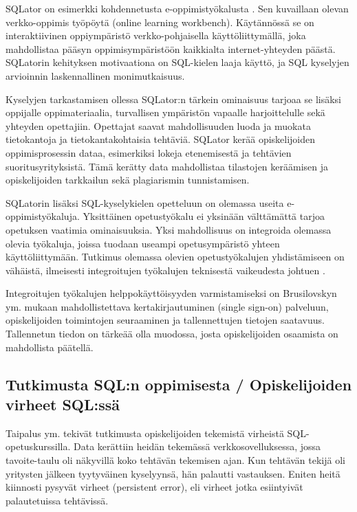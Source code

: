 \documentclass[finnish,twoside,openright]{HYgraduMLDS}
\begin{document}
SQLator on esimerkki kohdennetusta e-oppimistyökalusta \cite{sadiq2004sqlator}. Sen kuvaillaan olevan verkko-oppimis työpöytä (online learning workbench). Käytännössä se on interaktiivinen oppiympäristö verkko-pohjaisella käyttöliittymällä, joka mahdollistaa pääsyn oppimisympäristöön kaikkialta internet-yhteyden päästä. SQLatorin kehityksen motivaationa on SQL-kielen laaja käyttö, ja SQL kyselyjen arvioinnin laskennallinen monimutkaisuus. 

Kyselyjen tarkastamisen ollessa SQLator:n tärkein ominaisuus tarjoaa se lisäksi oppijalle oppimateriaalia, turvallisen ympäristön vapaalle harjoittelulle sekä yhteyden opettajiin. Opettajat saavat mahdollisuuden luoda ja muokata tietokantoja ja tietokantakohtaisia tehtäviä. SQLator kerää opiskelijoiden oppimisprosessin dataa, esimerkiksi lokeja etenemisestä ja tehtävien suoritusyrityksistä. Tämä kerätty data mahdollistaa tilastojen keräämisen ja opiskelijoiden tarkkailun sekä plagiarismin tunnistamisen.

SQLatorin lisäksi SQL-kyselykielen opetteluun on olemassa useita e-oppimistyökaluja. Yksittäinen opetustyökalu ei yksinään välttämättä tarjoa opetuksen vaatimia ominaisuuksia. Yksi mahdollisuus on integroida olemassa olevia työkaluja, joissa tuodaan useampi opetusympäristö yhteen käyttöliittymään. Tutkimus olemassa olevien opetustyökalujen yhdistämiseen on vähäistä, ilmeisesti integroitujen työkalujen teknisestä vaikeudesta johtuen \cite{Brusilovsky:2010:LSP:1656255.1656257}.

Integroitujen työkalujen helppokäyttöisyyden varmistamiseksi on Brusilovskyn ym. \cite{Brusilovsky:2010:LSP:1656255.1656257} mukaan mahdollistettava kertakirjautuminen (single sign-on) palveluun, opiskelijoiden toimintojen seuraaminen ja tallennettujen tietojen saatavuus. Tallennetun tiedon on tärkeää olla muodossa, josta opiskelijoiden osaamista on mahdollista päätellä.


\subsection{Tutkimusta SQL:n oppimisesta / Opiskelijoiden virheet SQL:ssä}

Taipalus ym. \cite{Taipalus:2019:EFS:3287324.3287359} tekivät tutkimusta opiskelijoiden tekemistä virheistä SQL-opetuskurssilla. Data kerättiin heidän tekemässä verkkosovelluksessa, jossa tavoite-taulu oli näkyvillä koko tehtävän tekemisen ajan. Kun tehtävän tekijä oli yritysten jälkeen tyytyväinen kyselyynsä, hän palautti vastauksen. Eniten heitä kiinnosti pysyvät virheet (persistent error), eli virheet jotka esiintyivät palautetuissa tehtävissä. 
\end{document}
